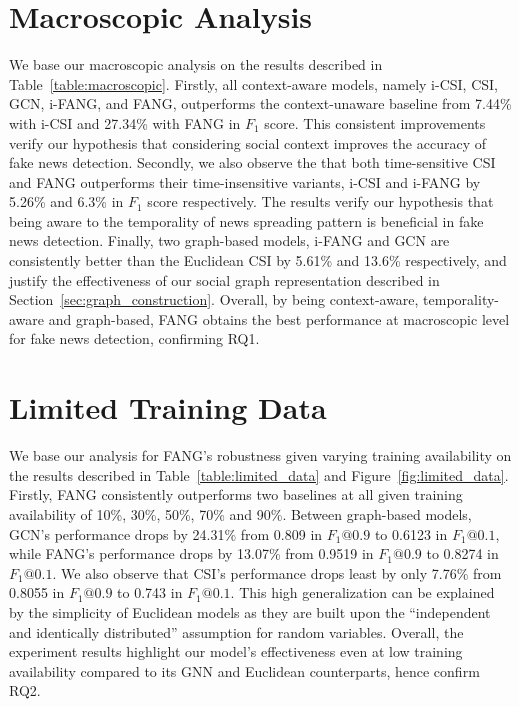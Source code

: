 \documentclass[fyp]{socreport}
\theoremstyle{definition}
\theoremstyle{hypothesis}
\begin{document}
\section{Macroscopic Analysis}
We base our macroscopic analysis on the results described in Table~\ref{table:macroscopic}. Firstly, all context-aware models, namely i-CSI, CSI, GCN, i-FANG, and FANG, outperforms the context-unaware baseline from 7.44\% with i-CSI and 27.34\% with FANG in $F_1$ score. This consistent improvements verify our hypothesis that considering social context improves the accuracy of fake news detection. Secondly, we also observe the that both time-sensitive CSI and FANG outperforms their time-insensitive variants, i-CSI and i-FANG by 5.26\% and 6.3\% in $F_1$ score respectively. The results verify our hypothesis that being aware to the temporality of news spreading pattern is beneficial in fake news detection. Finally, two graph-based models, i-FANG and GCN are consistently better than the Euclidean CSI by 5.61\% and 13.6\% respectively, and justify the effectiveness of our social graph representation described in Section~\ref{sec:graph_construction}. Overall, by being context-aware, temporality-aware and graph-based, FANG obtains the best performance at macroscopic level for fake news detection, confirming RQ1.

\section{Limited Training Data}
We base our analysis for FANG's robustness given varying training availability on the results described in Table~\ref{table:limited_data} and Figure~\ref{fig:limited_data}. Firstly, FANG consistently outperforms two baselines at all given training availability of 10\%, 30\%, 50\%, 70\% and 90\%. Between graph-based models, GCN's performance drops by 24.31\% from 0.809 in $F_1@0.9$ to 0.6123 in $F_1@0.1$, while FANG's performance drops by 13.07\% from 0.9519 in $F_1@0.9$ to 0.8274 in $F_1@0.1$. We also observe that CSI's performance drops least by only 7.76\% from 0.8055 in $F_1@0.9$ to 0.743 in $F_1@0.1$. This high generalization can be explained by the simplicity of Euclidean models as they are built upon the ``independent and identically distributed'' assumption for random variables. Overall, the experiment results highlight our model's effectiveness even at low training availability compared to its GNN and Euclidean counterparts, hence confirm RQ2.
\end{document}
